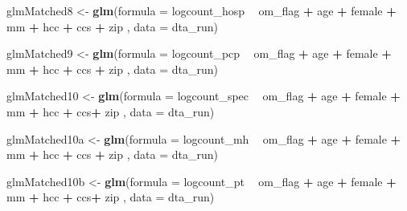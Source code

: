 \documentclass[]{article}
\newenvironment{Shaded}{\begin{snugshade}}{\end{snugshade}}
\newcommand{\KeywordTok}[1]{\textcolor[rgb]{0.13,0.29,0.53}{\textbf{#1}}}
\newcommand{\DataTypeTok}[1]{\textcolor[rgb]{0.13,0.29,0.53}{#1}}
\newcommand{\StringTok}[1]{\textcolor[rgb]{0.31,0.60,0.02}{#1}}
\newcommand{\OperatorTok}[1]{\textcolor[rgb]{0.81,0.36,0.00}{\textbf{#1}}}
\newcommand{\NormalTok}[1]{#1}
\begin{document}
\begin{Shaded}
\begin{Highlighting}[]
\NormalTok{glmMatched8 <-}\StringTok{ }\KeywordTok{glm}\NormalTok{(}\DataTypeTok{formula =}\NormalTok{ logcount_hosp }\OperatorTok{~}\StringTok{ }\NormalTok{om_flag }\OperatorTok{+}\StringTok{ }\NormalTok{age }\OperatorTok{+}\StringTok{ }\NormalTok{female }\OperatorTok{+}\StringTok{ }\NormalTok{mm }\OperatorTok{+}\StringTok{ }\NormalTok{hcc }\OperatorTok{+}\StringTok{ }\NormalTok{ccs }\OperatorTok{+}\StringTok{ }\NormalTok{zip ,}
                   \DataTypeTok{data    =}\NormalTok{ dta_run)}


\NormalTok{glmMatched9 <-}\StringTok{ }\KeywordTok{glm}\NormalTok{(}\DataTypeTok{formula =}\NormalTok{ logcount_pcp }\OperatorTok{~}\StringTok{ }\NormalTok{om_flag }\OperatorTok{+}\StringTok{ }\NormalTok{age }\OperatorTok{+}\StringTok{ }\NormalTok{female }\OperatorTok{+}\StringTok{ }\NormalTok{mm }\OperatorTok{+}\StringTok{ }\NormalTok{hcc }\OperatorTok{+}\StringTok{ }\NormalTok{ccs }\OperatorTok{+}\StringTok{ }\NormalTok{zip ,}
                   \DataTypeTok{data    =}\NormalTok{ dta_run)}

\NormalTok{glmMatched10 <-}\StringTok{ }\KeywordTok{glm}\NormalTok{(}\DataTypeTok{formula =}\NormalTok{ logcount_spec }\OperatorTok{~}\StringTok{ }\NormalTok{om_flag }\OperatorTok{+}\StringTok{ }\NormalTok{age }\OperatorTok{+}\StringTok{ }\NormalTok{female }\OperatorTok{+}\StringTok{ }\NormalTok{mm }\OperatorTok{+}\StringTok{ }\NormalTok{hcc }\OperatorTok{+}\StringTok{ }\NormalTok{ccs}\OperatorTok{+}\StringTok{ }\NormalTok{zip  ,}
                    \DataTypeTok{data    =}\NormalTok{ dta_run)}



\NormalTok{glmMatched10a <-}\StringTok{ }\KeywordTok{glm}\NormalTok{(}\DataTypeTok{formula =}\NormalTok{ logcount_mh }\OperatorTok{~}\StringTok{ }\NormalTok{om_flag }\OperatorTok{+}\StringTok{ }\NormalTok{age }\OperatorTok{+}\StringTok{ }\NormalTok{female }\OperatorTok{+}\StringTok{ }\NormalTok{mm }\OperatorTok{+}\StringTok{ }\NormalTok{hcc }\OperatorTok{+}\StringTok{ }\NormalTok{ccs }\OperatorTok{+}\StringTok{ }\NormalTok{zip ,}
                     \DataTypeTok{data    =}\NormalTok{ dta_run)}



\NormalTok{glmMatched10b <-}\StringTok{ }\KeywordTok{glm}\NormalTok{(}\DataTypeTok{formula =}\NormalTok{ logcount_pt }\OperatorTok{~}\StringTok{ }\NormalTok{om_flag }\OperatorTok{+}\StringTok{ }\NormalTok{age }\OperatorTok{+}\StringTok{ }\NormalTok{female }\OperatorTok{+}\StringTok{ }\NormalTok{mm }\OperatorTok{+}\StringTok{ }\NormalTok{hcc }\OperatorTok{+}\StringTok{ }\NormalTok{ccs}\OperatorTok{+}\StringTok{ }\NormalTok{zip  ,}
                     \DataTypeTok{data    =}\NormalTok{ dta_run)}



\end{Highlighting}
\end{Shaded}
\end{document}

